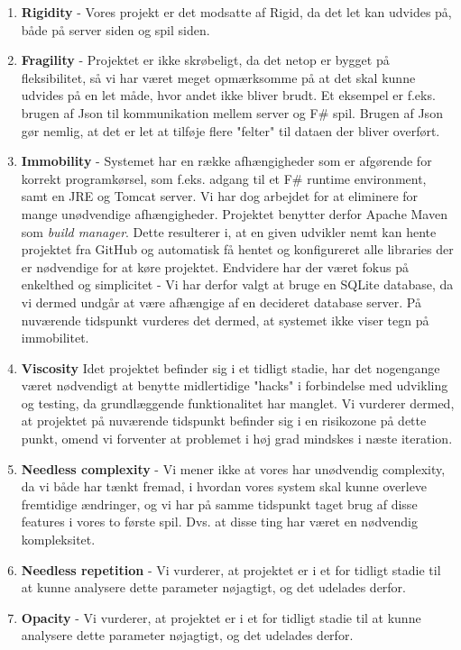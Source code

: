 \documentclass[12pt, a4paper]{article}
\begin{document}
\begin{enumerate}
    \item[] \textbf{Rigidity} - Vores projekt er det modsatte af Rigid, da det let kan udvides på, både på server siden og spil siden.
    \item[] \textbf{Fragility} - Projektet er ikke skrøbeligt, da det netop er bygget på fleksibilitet, så vi har været meget opmærksomme på at det skal kunne udvides på en let måde, hvor andet ikke bliver brudt. Et eksempel er f.eks. brugen af Json til kommunikation mellem server og F\# spil. Brugen af Json gør nemlig, at det er let at tilføje flere "felter" til dataen der bliver overført.
    \item[] \textbf{Immobility} - Systemet har en række afhængigheder som er afgørende for korrekt programkørsel, som f.eks. adgang til et F\# runtime environment, samt en  JRE og Tomcat server. Vi har dog arbejdet for at eliminere for mange unødvendige afhængigheder. Projektet benytter derfor Apache Maven som \emph{build manager}. Dette resulterer i, at en given udvikler nemt kan hente projektet fra GitHub og automatisk få hentet og konfigureret alle libraries der er nødvendige for at køre projektet. Endvidere har der været fokus på enkelthed og simplicitet - Vi har derfor valgt at bruge en SQLite database, da vi dermed undgår at være afhængige af en decideret database server. På nuværende tidspunkt vurderes det dermed, at systemet ikke viser tegn på immobilitet.
    \item[] \textbf{Viscosity} Idet projektet befinder sig i et tidligt stadie, har det nogengange været nødvendigt at benytte midlertidige "hacks" i forbindelse med udvikling og testing, da grundlæggende funktionalitet har manglet. Vi vurderer dermed, at projektet på nuværende tidspunkt befinder sig i en risikozone på dette punkt, omend vi forventer at problemet i høj grad mindskes i næste iteration.
    \item[] \textbf{Needless complexity} - Vi mener ikke at vores har unødvendig complexity, da vi både har tænkt fremad, i hvordan vores system skal kunne overleve fremtidige ændringer, og vi har på samme tidspunkt taget brug af disse features i vores to første spil. Dvs. at disse ting har været en nødvendig kompleksitet.
    \item[] \textbf{Needless repetition} - Vi vurderer, at projektet er i et for tidligt stadie til at kunne analysere dette parameter nøjagtigt, og det udelades derfor.
    \item[] \textbf{Opacity} - Vi vurderer, at projektet er i et for tidligt stadie til at kunne analysere dette parameter nøjagtigt, og det udelades derfor.
\end{enumerate}
\end{document}
